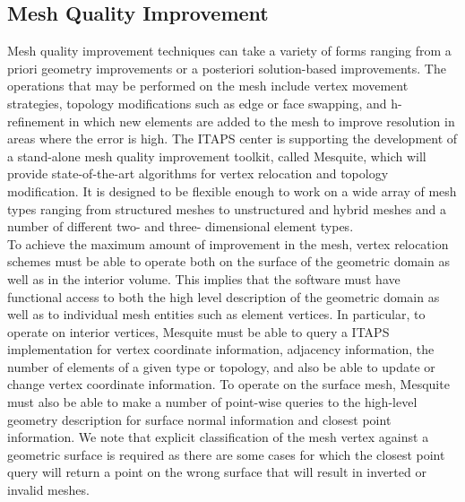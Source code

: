 \documentclass{article}
\begin{document}
\subsection{Mesh Quality Improvement}

Mesh quality improvement techniques can take a variety of forms 
ranging from a priori geometry improvements or a posteriori solution-based 
improvements. The operations that may be performed on the mesh 
include vertex movement strategies, topology modifications such 
as edge or face swapping, and h-refinement in which new elements 
are added to the mesh to improve resolution in areas where the 
error is high. The ITAPS center is supporting the development 
of a stand-alone mesh quality improvement toolkit, called Mesquite, 
which will provide state-of-the-art algorithms for vertex relocation 
and topology modification. It is designed to be flexible enough 
to work on a wide array of mesh types ranging from structured 
meshes to unstructured and hybrid meshes and a number of different 
two- and three- dimensional element types. \\

To achieve the maximum amount of improvement in the mesh, vertex 
relocation schemes must be able to operate both on the surface 
of the geometric domain as well as in the interior volume. This 
implies that the software must have functional access to both 
the high level description of the geometric domain as well as 
to individual mesh entities such as element vertices. In particular, 
to operate on interior vertices, Mesquite must be able to query 
a ITAPS implementation for vertex coordinate information, adjacency 
information, the number of elements of a given type or topology, and 
also be able to update or change vertex coordinate information. 
To operate on the surface mesh, Mesquite must also be able to 
make a number of point-wise queries to the high-level geometry 
description for surface normal information and closest point 
information. We note that explicit classification of the mesh 
vertex against a geometric surface is required as there are some 
cases for which the closest point query will return a point on 
the wrong surface that will result in inverted or invalid meshes.\\ 
\end{document}
